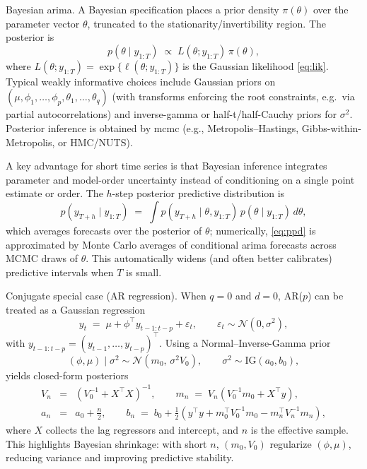 \documentclass[preprint, 3p,
authoryear]{elsarticle} %
\begin{document}
Bayesian \gls{arima}. A Bayesian specification places a prior density
\(\pi(\theta)\) over the parameter vector \(\theta\), truncated to the
stationarity/invertibility region. The posterior is \begin{equation}
p(\theta \mid y_{1:T}) \;\propto\; L(\theta; y_{1:T})\,\pi(\theta),
\label{eq:posterior}
\end{equation} where
\(L(\theta; y_{1:T})=\exp\{\ell(\theta; y_{1:T})\}\) is the Gaussian
likelihood \eqref{eq:lik}. Typical weakly informative choices include
Gaussian priors on \((\mu,\phi_1,\dots,\phi_p,\theta_1,\dots,\theta_q)\)
(with transforms enforcing the root constraints, e.g.~via partial
autocorrelations) and inverse-gamma or half-t/half-Cauchy priors for
\(\sigma^2\). Posterior inference is obtained by \gls{mcmc} (e.g.,
Metropolis--Hastings, Gibbs-within-Metropolis, or HMC/NUTS).

A key advantage for short time series is that Bayesian inference
integrates parameter and model-order uncertainty instead of conditioning
on a single point estimate or order. The \(h\)-step posterior predictive
distribution is \begin{equation}
p(y_{T+h}\mid y_{1:T}) \;=\; \int p\!\left(y_{T+h}\mid \theta, y_{1:T}\right)\, p(\theta\mid y_{1:T})\, d\theta,
\label{eq:ppd}
\end{equation} which averages forecasts over the posterior of
\(\theta\); numerically, \eqref{eq:ppd} is approximated by Monte Carlo
averages of conditional \gls{arima} forecasts across MCMC draws of
\(\theta\). This automatically widens (and often better calibrates)
predictive intervals when \(T\) is small.

Conjugate special case (AR regression). When \(q=0\) and \(d=0\),
AR(\(p\)) can be treated as a Gaussian regression \begin{equation}
y_t \;=\; \mu + \phi^\top y_{t-1:t-p} + \varepsilon_t,\qquad \varepsilon_t\sim \mathcal{N}(0,\sigma^2),
\label{eq:ar_reg}
\end{equation} with \(y_{t-1:t-p}=(y_{t-1},\dots,y_{t-p})^\top\). Using
a Normal--Inverse-Gamma prior \begin{equation}
(\phi,\mu)\mid \sigma^2 \sim \mathcal{N}\!\left(m_0,\,\sigma^2 V_0\right), 
\qquad \sigma^2 \sim \mathrm{IG}(a_0,b_0),
\end{equation} yields closed-form posteriors \begin{eqnarray}
V_n &=& \left(V_0^{-1} + X^\top X\right)^{-1}, 
\qquad 
m_n \;=\; V_n\left(V_0^{-1} m_0 + X^\top y\right),\\
a_n &=& a_0 + \frac{n}{2},
\qquad
b_n \;=\; b_0 + \frac{1}{2}\left(y^\top y + m_0^\top V_0^{-1} m_0 - m_n^\top V_n^{-1} m_n\right),
\end{eqnarray} where \(X\) collects the lag regressors and intercept,
and \(n\) is the effective sample. This highlights Bayesian shrinkage:
with short \(n\), \((m_0,V_0)\) regularize \((\phi,\mu)\), reducing
variance and improving predictive stability.
\end{document}
